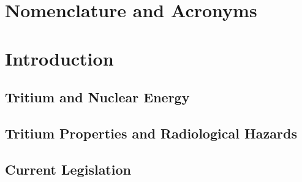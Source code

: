 \documentclass[12pt,a4paper]{book}
\begin{document}
\chapter*{Nomenclature and Acronyms} \label{chap:NomenclatureAcronyms}  %
{} %




\tableofcontents

\listoffigures

{} %

\listoftables

{} %




\chapter{Introduction}  \label{chap:GeneralIntroduction}  %
	\section{Tritium and Nuclear Energy}\label{sec:Introduction}
	 
	
	\section{Tritium Properties and Radiological Hazards}\label{sec:TritiumProperties}
	
	
	\section{Current Legislation}\label{sec:Legislation}
	 
	
\end{document}

